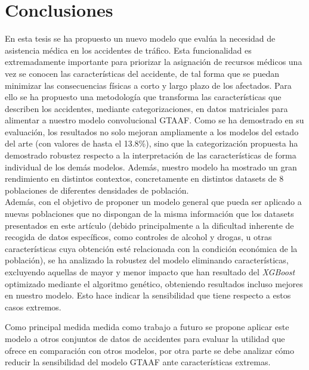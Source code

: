 
\chapter{Conclusiones}


En esta tesis se ha propuesto un nuevo modelo que evalúa la necesidad de asistencia médica en los accidentes de tráfico. Esta funcionalidad es extremadamente importante para priorizar la asignación de recursos médicos una vez se conocen las características del accidente, de tal forma que se puedan minimizar las consecuencias físicas a corto y largo plazo de los afectados. Para ello se ha propuesto una metodología que transforma las características que describen los accidentes, mediante categorizaciones, en datos matriciales para alimentar a nuestro modelo convolucional GTAAF. Como se ha demostrado en su evaluación, los resultados no solo mejoran ampliamente a los modelos del estado del arte (con valores de hasta el 13.8\%), sino que la categorización propuesta ha demostrado robustez respecto a la interpretación de las características de forma individual de los demás modelos. Además, nuestro modelo ha mostrado un gran rendimiento en distintos contextos, concretamente en  distintos datasets de 8 poblaciones de diferentes densidades de población.\\

Además, con el objetivo de proponer un modelo general que pueda ser aplicado a nuevas poblaciones que no dispongan de la misma información que los datasets presentados en este artículo (debido principalmente a la dificultad inherente de recogida de datos específicos, como controles de alcohol y drogas, u otras características cuya obtención esté relacionada con la condición económica de la población), se ha analizado la robustez del modelo eliminando características, excluyendo aquellas de mayor y menor impacto que han resultado del \textit{XGBoost} optimizado mediante el algoritmo genético, obteniendo resultados incluso mejores en nuestro modelo. Esto hace indicar la sensibilidad que tiene respecto a estos casos extremos.

Como principal medida medida como trabajo a futuro se propone aplicar este modelo a otros conjuntos de datos de accidentes para evaluar la utilidad que ofrece en comparación con otros modelos, por otra parte se debe analizar cómo reducir la sensibilidad del modelo GTAAF ante características extremas.


